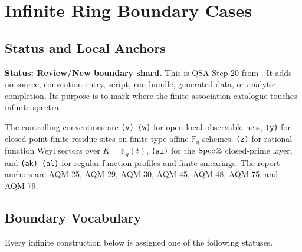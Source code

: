 
\section{Infinite Ring Boundary Cases}
\label{sec:qsa-infinite-ring-boundaries}

\subsection{Status and Local Anchors}

\textbf{Status: Review/New boundary shard.}  This is QSA Step 20 from
.  It adds no source,
convention entry, script, run bundle, generated data, or analytic
completion.  Its purpose is to mark where the finite association catalogue
touches infinite spectra.

The controlling conventions are \texttt{(v)}--\texttt{(w)} for open-local
observable nets, \texttt{(y)} for closed-point finite-residue sites on
finite-type affine \(\mathbb F_q\)-schemes, \texttt{(z)} for rational-function
Weyl sectors over \(K=\mathbb F_q(t)\), \texttt{(ai)} for the
\(\operatorname{Spec}\mathbb Z\) closed-prime layer, and \texttt{(ak)}--\texttt{(al)} for
regular-function profiles and finite smearings.  The report anchors are
AQM-25, AQM-29, AQM-30, AQM-45, AQM-48, AQM-75, and AQM-79.

\subsection{Boundary Vocabulary}

Every infinite construction below is assigned one of the following statuses.

